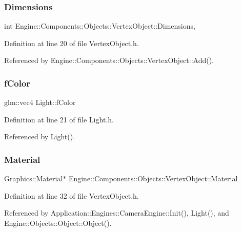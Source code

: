 \subsubsection{\texorpdfstring{Dimensions}{Dimensions}}
{\footnotesize\ttfamily int Engine\+::\+Components\+::\+Objects\+::\+Vertex\+Object\+::\+Dimensions\hspace{0.3cm}{\ttfamily [protected]}, {\ttfamily [inherited]}}



Definition at line 20 of file Vertex\+Object.\+h.



Referenced by Engine\+::\+Components\+::\+Objects\+::\+Vertex\+Object\+::\+Add().

\mbox{\label{classLight_a2dc72d90843d70b86165cc11c57cc2c9}} 
\subsubsection{\texorpdfstring{f\+Color}{fColor}}
{\footnotesize\ttfamily glm\+::vec4 Light\+::f\+Color}



Definition at line 21 of file Light.\+h.



Referenced by Light().

\mbox{\label{classEngine_1_1Components_1_1Objects_1_1VertexObject_a86c1fced4cdc5e59a66a635390a17eca}} 
\subsubsection{\texorpdfstring{Material}{Material}}
{\footnotesize\ttfamily Graphics\+::\+Material$\ast$ Engine\+::\+Components\+::\+Objects\+::\+Vertex\+Object\+::\+Material\hspace{0.3cm}{\ttfamily [inherited]}}



Definition at line 32 of file Vertex\+Object.\+h.



Referenced by Application\+::\+Engines\+::\+Camera\+Engine\+::\+Init(), Light(), and Engine\+::\+Objects\+::\+Object\+::\+Object().

\mbox{\label{classEngine_1_1Objects_1_1Object_acf41cc091fa270053245ed26bc28c8a4}} 
